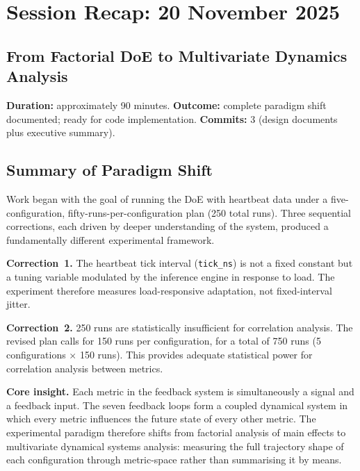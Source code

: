 
\section{Session Recap: 20 November 2025}
\subsection*{From Factorial DoE to Multivariate Dynamics Analysis}

\textbf{Duration:} approximately 90 minutes.
\textbf{Outcome:} complete paradigm shift documented; ready for code
implementation.
\textbf{Commits:} 3 (design documents plus executive summary).

\subsection{Summary of Paradigm Shift}

Work began with the goal of running the DoE with heartbeat data under a
five-configuration, fifty-runs-per-configuration plan (250 total runs).
Three sequential corrections, each driven by deeper understanding of the
system, produced a fundamentally different experimental framework.

\textbf{Correction~1.} The heartbeat tick interval (\texttt{tick\_ns}) is
not a fixed constant but a tuning variable modulated by the inference engine
in response to load. The experiment therefore measures load-responsive
adaptation, not fixed-interval jitter.

\textbf{Correction~2.} 250 runs are statistically insufficient for
correlation analysis. The revised plan calls for 150 runs per configuration,
for a total of 750 runs (5 configurations $\times$ 150 runs). This provides
adequate statistical power for correlation analysis between metrics.

\textbf{Core insight.} Each metric in the feedback system is simultaneously
a signal and a feedback input. The seven feedback loops form a coupled
dynamical system in which every metric influences the future state of every
other metric. The experimental paradigm therefore shifts from factorial
analysis of main effects to multivariate dynamical systems analysis:
measuring the full trajectory shape of each configuration through
metric-space rather than summarising it by means.

